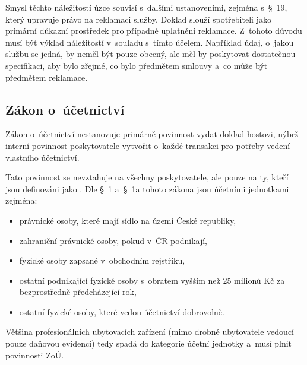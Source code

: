 Smysl těchto náležitostí úzce souvisí s~dalšími ustanoveními, zejména s~\S~19, který upravuje právo na reklamaci služby.
Doklad slouží spotřebiteli jako primární důkazní prostředek pro případné uplatnění reklamace.   
Z~tohoto důvodu musí být výklad náležitostí v~souladu s~tímto účelem.
Například údaj, o~jakou službu se jedná, by neměl být pouze obecný, ale měl by poskytovat dostatečnou specifikaci, aby bylo zřejmé, co bylo předmětem smlouvy a~co může být předmětem reklamace.

\subsection{Zákon o~účetnictví}
Zákon o~účetnictví \cite{cz-1991-563} nestanovuje primárně povinnost vydat doklad hostovi, nýbrž interní povinnost poskytovatele vytvořit o~každé transakci  pro potřeby vedení vlastního účetnictví.

Tato povinnost se nevztahuje na všechny poskytovatele, ale pouze na ty, kteří jsou definováni jako .
Dle \S~1 a~\S~1a tohoto zákona jsou účetními jednotkami zejména:
\begin{itemize}
    \item právnické osoby, které mají sídlo na území České republiky,
    \item zahraniční právnické osoby, pokud v~ČR podnikají,
    \item fyzické osoby zapsané v~obchodním rejstříku,
    \item ostatní podnikající fyzické osoby s~obratem vyšším než 25 milionů Kč za bezprostředně předcházející rok,
    \item ostatní fyzické osoby, které vedou účetnictví dobrovolně.
\end{itemize}
Většina profesionálních ubytovacích zařízení (mimo drobné ubytovatele vedoucí pouze daňovou evidenci) tedy spadá do kategorie účetní jednotky a~musí plnit povinnosti ZoÚ.

